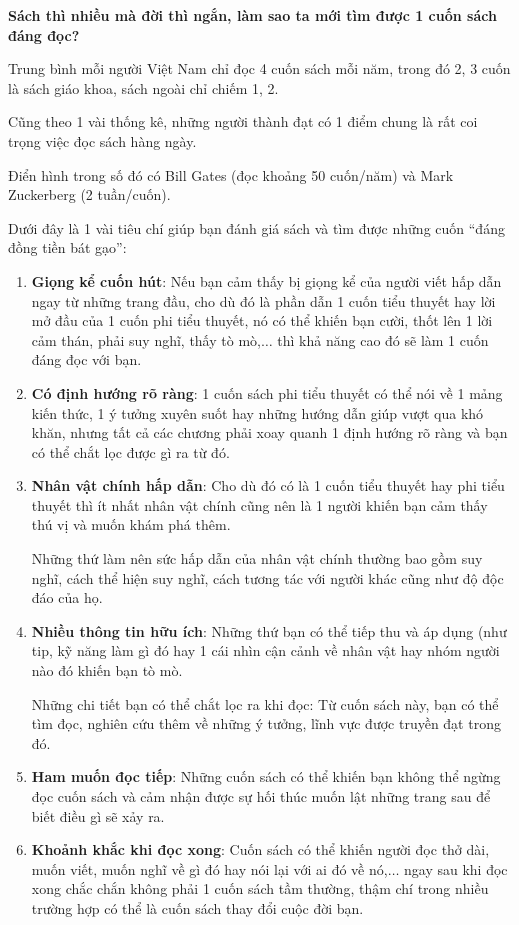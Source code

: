\documentclass{article}
\begin{document}
\textbf{ Sách thì nhiều mà đời thì ngắn, làm sao ta mới tìm được 1 cuốn sách đáng đọc?}

%
Trung bình mỗi người Việt Nam chỉ đọc 4 cuốn sách mỗi năm, trong đó 2, 3 cuốn là sách giáo khoa, sách ngoài chỉ chiếm 1, 2.

%
Cũng theo 1 vài thống kê, những người thành đạt có 1 điểm chung là rất coi trọng việc đọc sách hàng ngày.

Điển hình trong số đó có Bill Gates (đọc khoảng 50 cuốn/năm) và Mark Zuckerberg (2 tuần/cuốn).

%
Dưới đây là 1 vài tiêu chí giúp bạn đánh giá sách và tìm được những cuốn ``đáng đồng tiền bát gạo'':
\begin{enumerate}
	\item \textbf{Giọng kể cuốn hút}: Nếu bạn cảm thấy bị giọng kể của người viết hấp dẫn ngay từ những trang đầu, cho dù đó là phần dẫn 1 cuốn tiểu thuyết hay lời mở đầu của 1 cuốn phi tiểu thuyết, nó có thể khiến bạn cười, thốt lên 1 lời cảm thán, phải suy nghĩ, thấy tò mò,$\ldots$ thì khả năng cao đó sẽ làm 1 cuốn đáng đọc với bạn.
	\item \textbf{Có định hướng rõ ràng}: 1 cuốn sách phi tiểu thuyết có thể nói về 1 mảng kiến thức, 1 ý tưởng xuyên suốt hay những hướng dẫn giúp vượt qua khó khăn, nhưng tất cả các chương phải xoay quanh 1 định hướng rõ ràng và bạn có thể chắt lọc được gì ra từ đó.
	\item \textbf{Nhân vật chính hấp dẫn}: Cho dù đó có là 1 cuốn tiểu thuyết hay phi tiểu thuyết thì ít nhất nhân vật chính cũng nên là 1 người khiến bạn cảm thấy thú vị và muốn khám phá thêm.
	
	Những thứ làm nên sức hấp dẫn của nhân vật chính thường bao gồm suy nghĩ, cách thể hiện suy nghĩ, cách tương tác với người khác cũng như độ độc đáo của họ.
	\item \textbf{Nhiều thông tin hữu ích}: Những thứ bạn có thể tiếp thu và áp dụng (như tip, kỹ năng làm gì đó hay 1 cái nhìn cận cảnh về nhân vật hay nhóm người nào đó khiến bạn tò mò.
	
	Những chi tiết bạn có thể chắt lọc ra khi đọc: Từ cuốn sách này, bạn có thể tìm đọc, nghiên cứu thêm về những ý tưởng, lĩnh vực được truyền đạt trong đó.
	\item \textbf{Ham muốn đọc tiếp}: Những cuốn sách có thể khiến bạn không thể ngừng đọc cuốn sách và cảm nhận được sự hối thúc muốn lật những trang sau để biết điều gì sẽ xảy ra.
	\item \textbf{Khoảnh khắc khi đọc xong}: Cuốn sách có thể khiến người đọc thở dài, muốn viết, muốn nghĩ về gì đó hay nói lại với ai đó về nó,$\ldots$ ngay sau khi đọc xong chắc chắn không phải 1 cuốn sách tầm thường, thậm chí trong nhiều trường hợp có thể là cuốn sách thay đổi cuộc đời bạn.
\end{enumerate}
\end{document}
